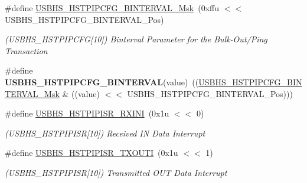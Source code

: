 \begin{DoxyCompactItemize}
\#define \mbox{\hyperlink{group__SAMS70__USBHS_gaedc9c4e67bfc7cc3d61e05ad12d33253}{U\+S\+B\+H\+S\+\_\+\+H\+S\+T\+P\+I\+P\+C\+F\+G\+\_\+\+B\+I\+N\+T\+E\+R\+V\+A\+L\+\_\+\+Msk}}~(0xffu $<$$<$ U\+S\+B\+H\+S\+\_\+\+H\+S\+T\+P\+I\+P\+C\+F\+G\+\_\+\+B\+I\+N\+T\+E\+R\+V\+A\+L\+\_\+\+Pos)
\begin{DoxyCompactList}\small\item\em (U\+S\+B\+H\+S\+\_\+\+H\+S\+T\+P\+I\+P\+C\+FG\mbox{[}10\mbox{]}) Binterval Parameter for the Bulk-\/\+Out/\+Ping Transaction \end{DoxyCompactList}\item 
\mbox{\label{group__SAMS70__USBHS_ga9dfcf332f4e592710da5e84377e52306}} 
\#define {\bfseries U\+S\+B\+H\+S\+\_\+\+H\+S\+T\+P\+I\+P\+C\+F\+G\+\_\+\+B\+I\+N\+T\+E\+R\+V\+AL}(value)~((\mbox{\hyperlink{group__SAMV71__USBHS_gaedc9c4e67bfc7cc3d61e05ad12d33253}{U\+S\+B\+H\+S\+\_\+\+H\+S\+T\+P\+I\+P\+C\+F\+G\+\_\+\+B\+I\+N\+T\+E\+R\+V\+A\+L\+\_\+\+Msk}} \& ((value) $<$$<$ U\+S\+B\+H\+S\+\_\+\+H\+S\+T\+P\+I\+P\+C\+F\+G\+\_\+\+B\+I\+N\+T\+E\+R\+V\+A\+L\+\_\+\+Pos)))
\item 
\mbox{\label{group__SAMS70__USBHS_gabd4bff53529d3a63d2f2a6b288ea4404}} 
\#define \mbox{\hyperlink{group__SAMS70__USBHS_gabd4bff53529d3a63d2f2a6b288ea4404}{U\+S\+B\+H\+S\+\_\+\+H\+S\+T\+P\+I\+P\+I\+S\+R\+\_\+\+R\+X\+I\+NI}}~(0x1u $<$$<$ 0)
\begin{DoxyCompactList}\small\item\em (U\+S\+B\+H\+S\+\_\+\+H\+S\+T\+P\+I\+P\+I\+SR\mbox{[}10\mbox{]}) Received IN Data Interrupt \end{DoxyCompactList}\item 
\mbox{\label{group__SAMS70__USBHS_gab412d773f75086777987bce75d9c2c79}} 
\#define \mbox{\hyperlink{group__SAMS70__USBHS_gab412d773f75086777987bce75d9c2c79}{U\+S\+B\+H\+S\+\_\+\+H\+S\+T\+P\+I\+P\+I\+S\+R\+\_\+\+T\+X\+O\+U\+TI}}~(0x1u $<$$<$ 1)
\begin{DoxyCompactList}\small\item\em (U\+S\+B\+H\+S\+\_\+\+H\+S\+T\+P\+I\+P\+I\+SR\mbox{[}10\mbox{]}) Transmitted O\+UT Data Interrupt \end{DoxyCompactList}\item 
\mbox{\label{group__SAMS70__USBHS_ga5b657f7ffb9144716c472b4873838612}} 

\end{DoxyCompactItemize}
